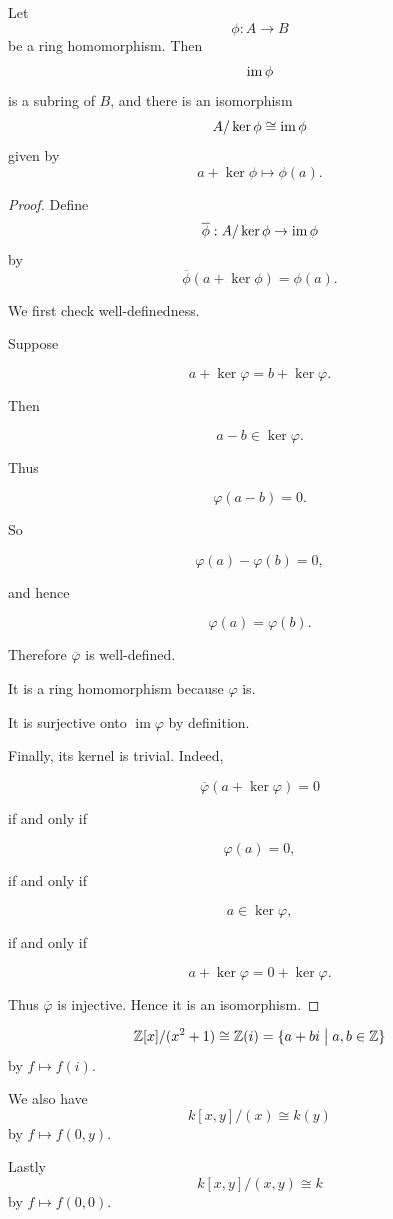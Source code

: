 \begin{thm}
    Let 
    \[
        \phi : A \to B
    \]
    be a ring homomorphism. Then 
    \[
        \operatorname{im} \phi
    \]
    is a subring of $B$, and there is an isomorphism 
    \[
        A / \ker \phi \cong \operatorname{im} \phi 
    \]
    given by 
    \[
        a + \ker \phi \mapsto \phi(a). 
    \]
\end{thm}
\begin{proof}
    Define 
    \[
        \overline{\phi} : A/\ker \phi \to \operatorname{im} \phi
    \]
    by 
    \[
        \overline \phi(a + \ker \phi) = \phi(a). 
    \]

    We first check well-definedness.

    Suppose

    $$a+\ker\varphi=b+\ker\varphi.$$

    Then

    $$a-b\in\ker\varphi.$$

    Thus

    $$\varphi(a-b)=0.$$

    So

    $$\varphi(a)-\varphi(b)=0,$$

    and hence

    $$\varphi(a)=\varphi(b).$$

    Therefore $\overline{\varphi}$ is well-defined.

    It is a ring homomorphism because $\varphi$ is.

    It is surjective onto $\operatorname{im}\varphi$ by definition.

    Finally, its kernel is trivial. Indeed,

    $$\overline{\varphi}(a+\ker\varphi)=0$$

    if and only if

    $$\varphi(a)=0,$$

    if and only if

    $$a\in\ker\varphi,$$

    if and only if

    $$a+\ker\varphi=0+\ker\varphi.$$

    Thus $\overline{\varphi}$ is injective. 
    Hence it is an isomorphism.
\end{proof}
\begin{ex}
    \[
        \mathbb Z[x]/(x^2 + 1) \cong \mathbb Z(i) = 
        \{a + bi \bigm| a,b \in \mathbb Z\}
    \]
    by $f \mapsto f(i)$. 

    We also have 
    \[
        k[x,y]/(x) \cong k(y) 
    \]
    by $f \mapsto f(0,y)$. 

    Lastly 
    \[
        k[x,y] / (x,y) \cong k
    \]
    by $f \mapsto f(0,0)$.
\end{ex}

